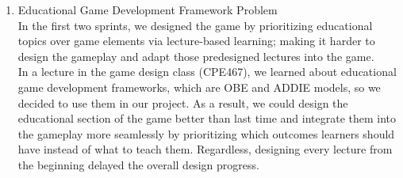 \documentclass[12pt,oneside,openright,a4paper]{cpe-english-project}
\begin{document}
\begin{enumerate}
	\item Educational Game Development Framework Problem \\
	In the first two sprints, we designed the game by prioritizing educational topics over game elements via lecture-based learning; making it harder to design the gameplay and adapt those predesigned lectures into the game. \\
	In a lecture in the game design class (CPE467), we learned about educational game development frameworks, which are OBE and ADDIE models, so we decided to use them in our project. As a result, we could design the educational section of the game better than last time and integrate them into the gameplay more seamlessly by prioritizing which outcomes learners should have instead of what to teach them. Regardless, designing every lecture from the beginning delayed the overall design progress.

\end{enumerate}


%
%
%
%


\nocite{*}
\end{document}
